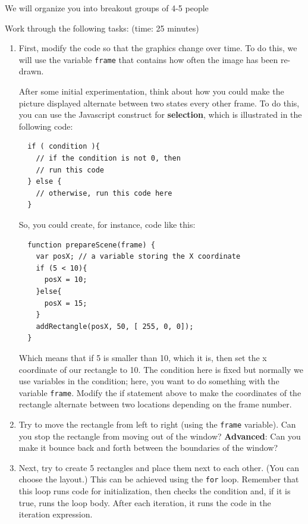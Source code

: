 \begin{steps}
\item We will organize you into breakout groups of 4-5 people
\item Work through the following tasks: (time: 25 minutes)
  \begin{enumerate}
  \item First, modify the code so that the graphics change over time.
  To do this, we will use the variable \texttt{frame} that contains how often the image has been re-drawn.

  After some initial experimentation, think about how you could make the picture displayed alternate between two states every other frame.
  To do this, you can use the Javascript construct for \textbf{selection}, which is illustrated in the following code:
\begin{lstlisting}
  if ( condition ){
    // if the condition is not 0, then
    // run this code
  } else {
    // otherwise, run this code here
  }
\end{lstlisting}
  So, you could create, for instance, code like this:
\begin{lstlisting}
  function prepareScene(frame) {
    var posX; // a variable storing the X coordinate
    if (5 < 10){
      posX = 10;
    }else{
      posX = 15;
    }
    addRectangle(posX, 50, [ 255, 0, 0]);
  }
\end{lstlisting}
Which means that if 5 is smaller than 10, which it is, then set the x coordinate of our rectangle to 10.
The condition here is fixed but normally we use variables in the condition;
here, you want to do something with the variable \texttt{frame}.
Modify the if statement above to make the coordinates of the rectangle alternate between two locations depending on the frame number.

  \item Try to move the rectangle from left to right (using the \texttt{frame} variable).
  Can you stop the rectangle from moving out of the window?
  \textbf{Advanced}: Can you make it bounce back and forth between the boundaries of the window?

  \item Next, try to create 5 rectangles and place them next to each other. (You can choose the layout.)
  This can be achieved using the \texttt{for} loop.
  Remember that this loop runs code for initialization, then checks the condition and, if it is true, runs the loop body. After each iteration, it runs the code in the iteration expression.


\end{enumerate}
\end{steps}
